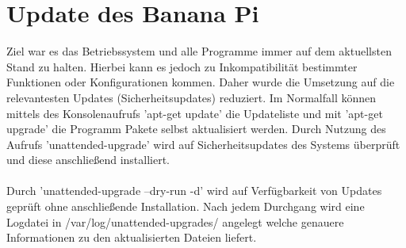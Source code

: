 \section{Update des Banana Pi}
Ziel war es das Betriebssystem und alle Programme immer auf dem aktuellsten Stand zu halten. Hierbei kann es jedoch zu Inkompatibilität bestimmter Funktionen  oder Konfigurationen kommen. Daher wurde die Umsetzung auf die relevantesten Updates (Sicherheitsupdates) reduziert. Im Normalfall können mittels des Konsolenaufrufs  'apt-get update' die Updateliste und mit 'apt-get upgrade' die Programm Pakete selbst aktualisiert werden. Durch Nutzung des Aufrufs 'unattended-upgrade' wird auf Sicherheitsupdates des Systems überprüft und diese anschließend installiert.\\
\\
Durch 'unattended-upgrade --dry-run -d' wird auf Verfügbarkeit von Updates geprüft ohne anschließende Installation. Nach jedem Durchgang wird eine Logdatei in /var/log/unattended-upgrades/ angelegt welche genauere Informationen zu den aktualisierten Dateien liefert.

